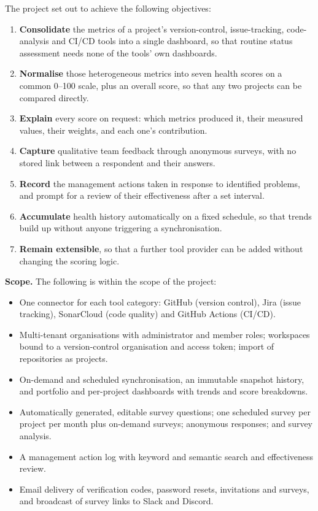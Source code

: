 The project set out to achieve the following objectives:

\begin{enumerate}
  \item \textbf{Consolidate} the metrics of a project's version-control,
  issue-tracking, code-analysis and CI/CD tools into a single dashboard, so
  that routine status assessment needs none of the tools' own dashboards.
  \item \textbf{Normalise} those heterogeneous metrics into seven health scores
  on a common 0--100 scale, plus an overall score, so that any two projects
  can be compared directly.
  \item \textbf{Explain} every score on request: which metrics produced it,
  their measured values, their weights, and each one's contribution.
  \item \textbf{Capture} qualitative team feedback through anonymous surveys,
  with no stored link between a respondent and their answers.
  \item \textbf{Record} the management actions taken in response to identified
  problems, and prompt for a review of their effectiveness after a set
  interval.
  \item \textbf{Accumulate} health history automatically on a fixed schedule,
  so that trends build up without anyone triggering a synchronisation.
  \item \textbf{Remain extensible}, so that a further tool provider can be
  added without changing the scoring logic.
\end{enumerate}

\textbf{Scope.} The following is within the scope of the project:

\begin{itemize}
  \item One connector for each tool category: GitHub (version control), Jira
  (issue tracking), SonarCloud (code quality) and GitHub Actions (CI/CD).
  \item Multi-tenant organisations with administrator and member roles;
  workspaces bound to a version-control organisation and access token; import
  of repositories as projects.
  \item On-demand and scheduled synchronisation, an immutable snapshot
  history, and portfolio and per-project dashboards with trends and score
  breakdowns.
  \item Automatically generated, editable survey questions; one scheduled
  survey per project per month plus on-demand surveys; anonymous responses;
  and survey analysis.
  \item A management action log with keyword and semantic search and
  effectiveness review.
  \item Email delivery of verification codes, password resets, invitations and
  surveys, and broadcast of survey links to Slack and Discord.
\end{itemize}

